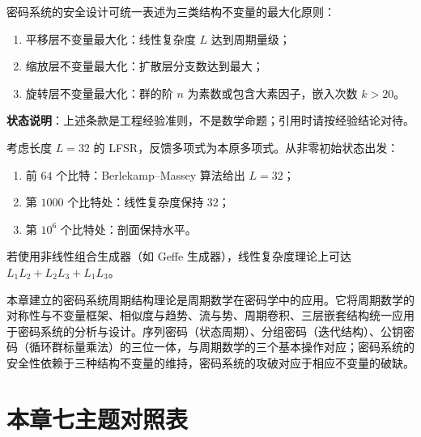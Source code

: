 \begin{remark}\label{cor:crypto_design}
密码系统的安全设计可统一表述为三类结构不变量的最大化原则：
\begin{enumerate}[label=(\roman*)]
    \item 平移层不变量最大化：线性复杂度 \(L\) 达到周期量级；
    \item 缩放层不变量最大化：扩散层分支数达到最大；
    \item 旋转层不变量最大化：群的阶 \(n\) 为素数或包含大素因子，嵌入次数 \(k>20\)。
\end{enumerate}
\textbf{状态说明}：上述条款是工程经验准则，不是数学命题；引用时请按经验结论对待。
\end{remark}

\begin{example}\label{ex:lfsr_diagnosis}
考虑长度 \(L=32\) 的 LFSR，反馈多项式为本原多项式。从非零初始状态出发：
\begin{enumerate}[label=(\roman*)]
    \item 前 \(64\) 个比特：Berlekamp--Massey 算法给出 \(L=32\)；
    \item 第 \(1000\) 个比特处：线性复杂度保持 \(32\)；
    \item 第 \(10^6\) 个比特处：剖面保持水平。
\end{enumerate}
若使用非线性组合生成器（如 Geffe 生成器），线性复杂度理论上可达 \(L_1L_2+L_2L_3+L_1L_3\)。
\end{example}

\begin{remark}[与全书的衔接]\label{rem:crypto_book_interface}
本章建立的密码系统周期结构理论是周期数学在密码学中的应用。它将周期数学的对称性与不变量框架、相似度与趋势、流与势、周期卷积、三层嵌套结构统一应用于密码系统的分析与设计。序列密码（状态周期）、分组密码（迭代结构）、公钥密码（循环群标量乘法）的三位一体，与周期数学的三个基本操作对应；密码系统的安全性依赖于三种结构不变量的维持，密码系统的攻破对应于相应不变量的破缺。
\end{remark}

\section*{本章七主题对照表}

